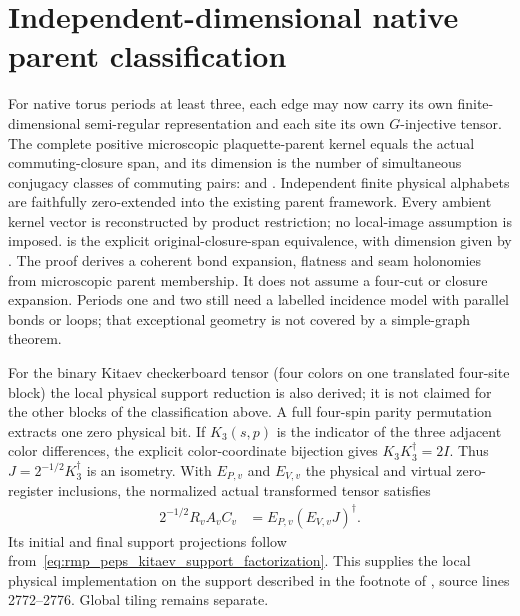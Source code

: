 \documentclass{article}
\begin{document}
\section{Independent-dimensional native parent classification}
For native torus periods at least three, each edge may now carry its own
finite-dimensional semi-regular representation and each site its own
$G$-injective tensor. The complete positive microscopic plaquette-parent
kernel equals the actual commuting-closure span, and its dimension is the
number of simultaneous conjugacy classes of commuting pairs:
and
.
Independent finite physical alphabets are faithfully zero-extended into the
existing parent framework. Every ambient kernel vector is reconstructed by
product restriction; no local-image assumption is imposed.
is the explicit original-closure-span equivalence, with dimension given by
.
The proof derives a coherent bond expansion, flatness and seam holonomies
from microscopic parent membership. It does not assume a four-cut or
closure expansion. Periods one and two still need a labelled incidence
model with parallel bonds or loops; that exceptional geometry is not
covered by a simple-graph theorem.

For the binary Kitaev checkerboard tensor (four colors on one translated
four-site block) the local physical support reduction is also derived; it is
not claimed for the other blocks of the classification above.
A full four-spin parity permutation extracts one zero physical bit. If
$K_3(s,p)$ is the indicator of the three adjacent color differences, the
explicit color-coordinate bijection gives $K_3K_3^\dagger=2I$.
Thus $J=2^{-1/2}K_3^\dagger$ is an isometry. With $E_{P,v}$ and $E_{V,v}$
the physical and virtual zero-register inclusions, the normalized actual
transformed tensor satisfies
\begin{align}
 2^{-1/2}R_vA_vC_v&=E_{P,v}(E_{V,v}J)^\dagger.\label{eq:rmp_peps_kitaev_support_factorization}
\end{align}
Its initial and final support projections follow from~\eqref{eq:rmp_peps_kitaev_support_factorization}.
This supplies the local physical implementation on the support described
in the footnote of \cite{Schuch2010PEPS}, source lines 2772--2776. Global tiling remains separate.
\end{document}
